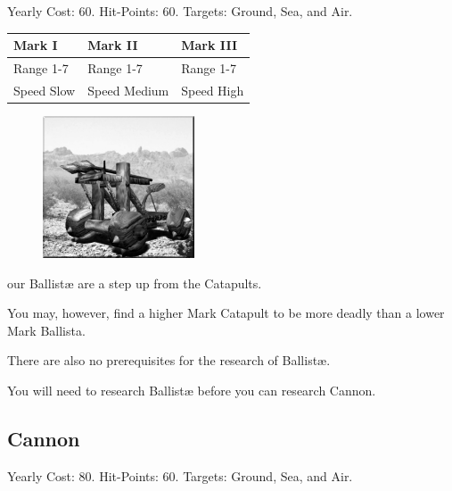 

\begin{center}
	Yearly Cost: 60. Hit-Points: 60. Targets: Ground, Sea, and Air.
\end{center}

\begin{tabular}{ | p{1.3in} | p{1.3in} | p{1.3in} |}
	\hline
	\textbf{Mark I}	& \textbf{Mark II} & \textbf{Mark III} \\ \hline
	Range 1-7	& Range 1-7& Range 1-7 \\ \hline
	Speed Slow	& Speed Medium & Speed High \\ \hline
\end{tabular}

\begin{figure}
	\vspace{-20pt}
	\begin{center}
		\includegraphics[width=0.4\textwidth]{Aballista}
	\end{center}
\end{figure}

our Ballistæ are a step up from the Catapults.

You may, however, find a higher Mark Catapult to be more deadly than a lower Mark Ballista.

There are also no prerequisites for the research of Ballistæ.

You will need to research Ballistæ before you can research Cannon.

\clearpage

\subsection{Cannon}


\begin{center}
	Yearly Cost: 80. Hit-Points: 60. Targets: Ground, Sea, and Air.
\end{center}

